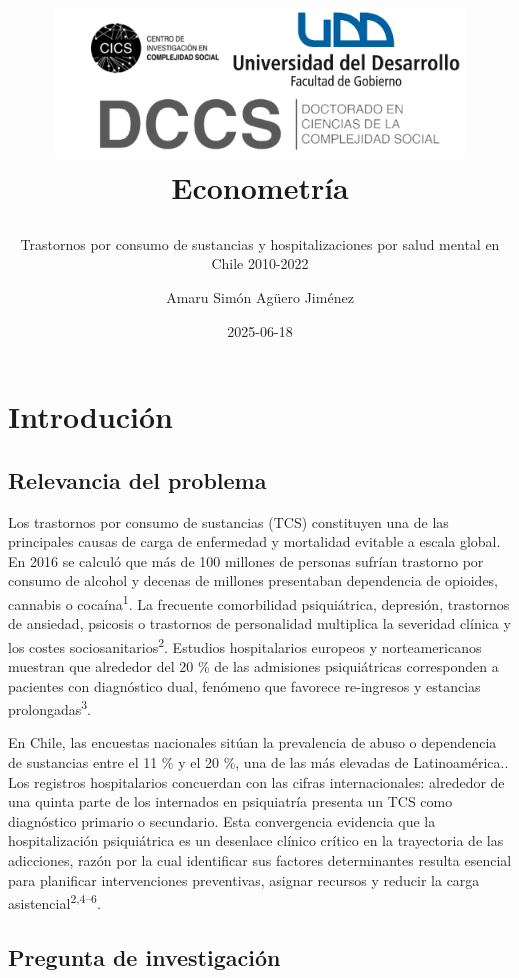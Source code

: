 \documentclass[
  spanish,
  10pt,
]{article}
\title{\begin{center}
  \includegraphics[height=4cm]{logo.png} \\[1cm]
  \Large Econometría \\
\end{center}}
\subtitle{Trastornos por consumo de sustancias y hospitalizaciones por
salud mental en Chile 2010-2022}
\author{Amaru Simón Agüero Jiménez}
\date{2025-06-18}
\renewcommand*\contentsname{Tabla de contenidos}
\newcommand\contentsname{Tabla de contenidos}
\begin{document}
\maketitle

\renewcommand*\contentsname{Tabla de contenidos}
{
\hypersetup{linkcolor=}
\setcounter{tocdepth}{3}
\tableofcontents
}

\newpage

\section{Introdución}\label{introduciuxf3n}

\subsection{Relevancia del problema}\label{relevancia-del-problema}

Los trastornos por consumo de sustancias (TCS) constituyen una de las
principales causas de carga de enfermedad y mortalidad evitable a escala
global. En 2016 se calculó que más de 100 millones de personas sufrían
trastorno por consumo de alcohol y decenas de millones presentaban
dependencia de opioides, cannabis o cocaína\textsuperscript{1}. La
frecuente comorbilidad psiquiátrica, depresión, trastornos de ansiedad,
psicosis o trastornos de personalidad multiplica la severidad clínica y
los costes sociosanitarios\textsuperscript{2}. Estudios hospitalarios
europeos y norteamericanos muestran que alrededor del 20 \% de las
admisiones psiquiátricas corresponden a pacientes con diagnóstico dual,
fenómeno que favorece re-ingresos y estancias
prolongadas\textsuperscript{3}.

En Chile, las encuestas nacionales sitúan la prevalencia de abuso o
dependencia de sustancias entre el 11 \% y el 20 \%, una de las más
elevadas de Latinoamérica.. Los registros hospitalarios concuerdan con
las cifras internacionales: alrededor de una quinta parte de los
internados en psiquiatría presenta un TCS como diagnóstico primario o
secundario. Esta convergencia evidencia que la hospitalización
psiquiátrica es un desenlace clínico crítico en la trayectoria de las
adicciones, razón por la cual identificar sus factores determinantes
resulta esencial para planificar intervenciones preventivas, asignar
recursos y reducir la carga asistencial\textsuperscript{2,4--6}.

\subsection{Pregunta de
investigación}\label{pregunta-de-investigaciuxf3n}
\end{document}
